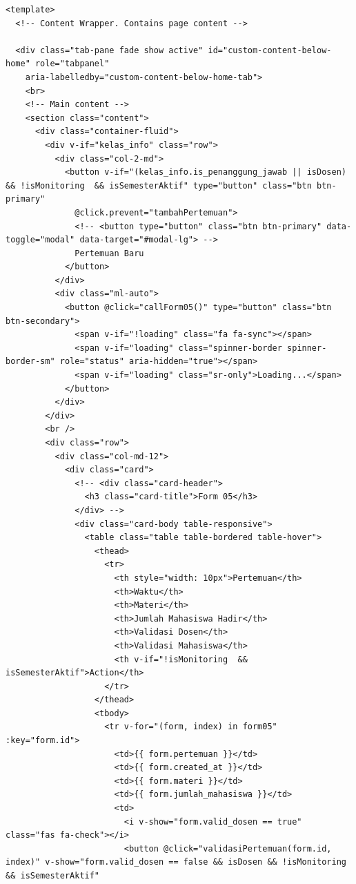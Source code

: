 \begin{lstlisting}[breaklines]
<template>
  <!-- Content Wrapper. Contains page content -->

  <div class="tab-pane fade show active" id="custom-content-below-home" role="tabpanel"
    aria-labelledby="custom-content-below-home-tab">
    <br>
    <!-- Main content -->
    <section class="content">
      <div class="container-fluid">
        <div v-if="kelas_info" class="row">
          <div class="col-2-md">
            <button v-if="(kelas_info.is_penanggung_jawab || isDosen) && !isMonitoring  && isSemesterAktif" type="button" class="btn btn-primary"
              @click.prevent="tambahPertemuan">
              <!-- <button type="button" class="btn btn-primary" data-toggle="modal" data-target="#modal-lg"> -->
              Pertemuan Baru
            </button>
          </div>
          <div class="ml-auto">
            <button @click="callForm05()" type="button" class="btn btn-secondary">
              <span v-if="!loading" class="fa fa-sync"></span>
              <span v-if="loading" class="spinner-border spinner-border-sm" role="status" aria-hidden="true"></span>
              <span v-if="loading" class="sr-only">Loading...</span>
            </button>
          </div>
        </div>
        <br />
        <div class="row">
          <div class="col-md-12">
            <div class="card">
              <!-- <div class="card-header">
                <h3 class="card-title">Form 05</h3>
              </div> -->
              <div class="card-body table-responsive">
                <table class="table table-bordered table-hover">
                  <thead>
                    <tr>
                      <th style="width: 10px">Pertemuan</th>
                      <th>Waktu</th>
                      <th>Materi</th>
                      <th>Jumlah Mahasiswa Hadir</th>
                      <th>Validasi Dosen</th>
                      <th>Validasi Mahasiswa</th>
                      <th v-if="!isMonitoring  && isSemesterAktif">Action</th>
                    </tr>
                  </thead>
                  <tbody>
                    <tr v-for="(form, index) in form05" :key="form.id">
                      <td>{{ form.pertemuan }}</td>
                      <td>{{ form.created_at }}</td>
                      <td>{{ form.materi }}</td>
                      <td>{{ form.jumlah_mahasiswa }}</td>
                      <td>
                        <i v-show="form.valid_dosen == true" class="fas fa-check"></i>
                        <button @click="validasiPertemuan(form.id, index)" v-show="form.valid_dosen == false && isDosen && !isMonitoring  && isSemesterAktif"

\end{lstlisting}
